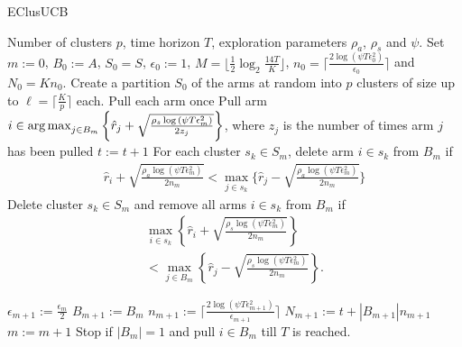 \begin{algorithm}[!h]
\caption{EClusUCB}
\label{alg:eclusucb}
\begin{algorithmic}
 Number of clusters $p$, time horizon $T$, exploration parameters $\rho_a$, $\rho_s$ and $\psi$.
 Set $m:=0$, $B_{0}:=A$, $S_0 = S$, $\epsilon_{0}:=1$, $M=\big \lfloor \frac{1}{2}\log_{2} \frac{14T}{K}\big\rfloor$, $n_{0}=\bigg\lceil\frac{2\log{(\psi T\epsilon_{0}^{2})}}{\epsilon_{0}}\bigg\rceil$ and  $N_{0}=Kn_{0}$.
\State Create a partition $S_0$ of the arms at random into $p$ clusters of size up to $\ell=\bigg\lceil \frac{K}{p} \bigg\rceil$ each.
\State Pull each arm once
\State Pull arm $i\in \operatorname*{arg\,max}_{j\in B_{m}}\bigg\lbrace \hat{r}_{j} + \sqrt{\frac{\rho_{s}\log{(\psi T\epsilon_{m}^{2})}}{2 z_{j}}} \bigg\rbrace$, where $z_j$ is the number of times arm $j$ has been pulled
\State $t:=t+1$
\ArmElim
\State For each cluster $s_k \in S_{m}$, delete arm ${i}\in s_{k}$ from $B_{m}$ if
\begin{align*}
\hat{r}_{i} + \sqrt{\frac{\rho_{a}\log{(\psi T\epsilon_{m}^{2})}}{2 n_{m}}}  < \max_{{j}\in s_{k}}\bigg\lbrace\hat{r}_{j} -\sqrt{\frac{\rho_{a}\log{(\psi T\epsilon_{m}^{2})}}{2 n_{m}}} \bigg\rbrace
\end{align*}
\EndArmElim
\ClusElim
\State Delete cluster $s_{k}\in S_{m}$ and remove all arms $i\in s_{k}$ from $B_{m}$ if 
\begin{align*}
 \max_{{i}\in s_{k}}\left\lbrace\hat{r}_{i} + \sqrt{\frac{\rho_{s}\log{(\psi T\epsilon_{m}^{2})}}{2 n_{m}}}\right\rbrace \\
 < \max_{{j}\in B_{m}} \left\lbrace\hat{r}_{j} - \sqrt{\frac{\rho_{s} \log{(\psi T\epsilon_{m}^{2})}}{2 n_{m}}}\right\rbrace.
\end{align*}
\EndClusElim

\State $\epsilon_{m+1}:=\frac{\epsilon_{m}}{2}$\vspace{0.5ex}
\State $B_{m+1}:=B_{m}$
\State $n_{m+1}:=\bigg\lceil\frac{2\log{(\psi T\epsilon_{m+1}^{2})}}{\epsilon_{m+1}}\bigg\rceil$
\State $N_{m+1}:=t+|B_{m+1}| n_{m+1}$
\State $m:=m+1$
\State Stop if $|B_{m}|=1$ and pull ${i}\in B_{m}$ till $T$ is reached.
\EndIf
\EndFor
\end{algorithmic}
\end{algorithm}
